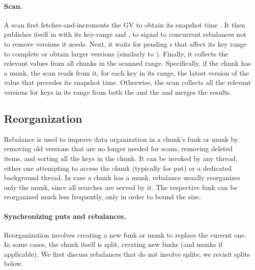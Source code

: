 \paragraph{Scan.}
A scan first fetches-and-increments the GV to obtain its snapshot time . 
 It then publishes itself in  with its key-range and , to 
 signal to concurrent rebalances not to remove versions it needs. Next, it waits for pending
 s that affect its key range to complete or obtain larger versions (similarly to ). 
Finally, it collects the relevant values from all chunks in the scanned range.
Specifically, if the chunk has a munk, the scan reads from it, for each key in its range, 
the latest version of the value that precedes its snapshot time.
Otherwise, the scan collects all the relevant versions for keys in its range from both 
the  and the  and merges the results.
 

\subsection{Reorganization}
\label{ssec:rebalance}


Rebalance is used to improve data organization in a chunk's funk or munk by removing old versions that are no longer needed for scans, 
removing deleted items, and sorting all the keys in the chunk. 
It can be invoked by any thread, either one attempting to access the chunk (typically for put) or a dedicated background thread.
In case a chunk has a munk, rebalance usually reorganizes only  the munk, since all searches are served by it. 
The respective funk can be reorganized much less frequently, only in order to bound the  size. 

\paragraph{Synchronizing puts and rebalances.}
Reorganization involves creating a new funk or munk  to replace the  current one.  In some cases, the chunk itself is split, creating new funks (and munks if applicable). We first discuss rebalances that do not involve splits; we revisit splits below.


